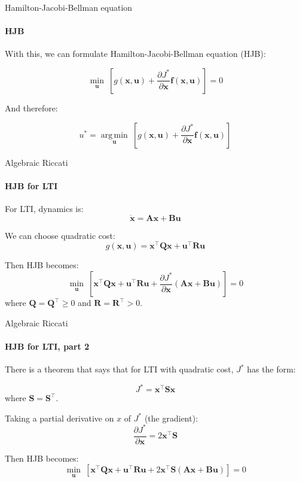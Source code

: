 \documentclass{beamer}
\DeclareMathOperator*{\argmin}{arg\,min}
\begin{document}
\begin{frame}{Hamilton-Jacobi-Bellman equation}
\framesubtitle{HJB}
\begin{flushleft}

With this, we can formulate Hamilton-Jacobi-Bellman equation (HJB):

\[
\underset{\mathbf u}{\min} \ [ g(\mathbf x, \mathbf u) + 
\frac{\partial J^*}{\partial \mathbf x} \mathbf f (\mathbf x, \mathbf u) ] = 0
\]

And therefore:

\[
u^* = \underset{\mathbf u}{\argmin} \ [ g(\mathbf x, \mathbf u) + 
\frac{\partial J^*}{\partial \mathbf x} \mathbf f (\mathbf x, \mathbf u) ]
\]

\end{flushleft}
\end{frame}

\begin{frame}{Algebraic Riccati}
\framesubtitle{HJB for LTI}
\begin{flushleft}

For LTI, dynamics is:
\[
\dot {\mathbf x} = \mathbf A  \mathbf x + \mathbf B \mathbf u
\]

We can choose quadratic cost:
\[
g(\mathbf  x, \mathbf  u) = 
\mathbf  x^\top \mathbf Q \mathbf x +
\mathbf  u^\top \mathbf R \mathbf u 
\]

Then HJB becomes:
\[
\underset{\mathbf u}{\min} \ [ 
\mathbf  x^\top \mathbf Q \mathbf x +
\mathbf  u^\top \mathbf R \mathbf u + 
\frac{\partial J^*}{\partial \mathbf x} 
(\mathbf A  \mathbf x + \mathbf B \mathbf u)] = 0
\]
%
where $\mathbf Q = \mathbf Q^\top \geq 0 $ and $\mathbf R = \mathbf R^\top > 0$.

\end{flushleft}
\end{frame}


\begin{frame}{Algebraic Riccati}
\framesubtitle{HJB for LTI, part 2}
\begin{flushleft}

There is a theorem that says that for LTI with quadratic cost, $J^*$ has the form:

\[
J^* = \mathbf  x^\top \mathbf S \mathbf x
\]
%
where $\mathbf S = \mathbf S^\top$.

\bigskip

Taking a partial derivative on $x$ of $J^*$ (the gradient):
\[
\frac{\partial J^*}{\partial \mathbf x}  = 2\mathbf x^\top \mathbf S
\]

Then HJB becomes:
\[
\underset{\mathbf u}{\min} \ [ 
\mathbf  x^\top \mathbf Q \mathbf x +
\mathbf  u^\top \mathbf R \mathbf u + 
2\mathbf x^\top \mathbf S
(\mathbf A  \mathbf x + \mathbf B \mathbf u)] = 0
\]

\end{flushleft}
\end{frame}
\end{document}
